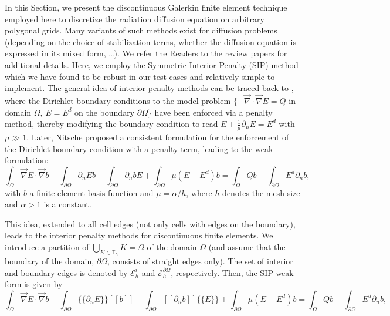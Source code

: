 \documentclass[preprint,10pt]{elsarticle}
\renewcommand{\div}{\vec{\nabla}\! \cdot \!}
\newcommand{\grad}{\vec{\nabla}}
\newcommand{\jmp}[1]{[\![#1]\!]}                     %
\newcommand{\mvl}[1]{\{\!\!\{#1\}\!\!\}}             %
\newcommand{\tf}{b}
\renewcommand{\(}{\left(}
\renewcommand{\)}{\right)}
\renewcommand{\[}{\left[}
\renewcommand{\]}{\right]}
\begin{document}
In this Section, we present the discontinuous Galerkin finite element technique employed here to
discretize the radiation diffusion equation on arbitrary polygonal grids. Many variants of such
methods exist for diffusion problems (depending on the choice of stabilization terms, whether 
the diffusion equation is expressed in its mixed form, \ldots). We refer the Readers to the review
papers \cite{unification,brezzi} for additional details. Here, we employ the Symmetric
Interior Penalty (SIP) method which we have found to be robust in our test cases and relatively simple 
to implement.
The general idea of interior penalty methods can be traced back to \cite{lions1968}, where the Dirichlet
boundary conditions to the model problem $\{-\div \grad E = Q$ in domain $\Omega$, $E=E^d$ on 
the boundary $\partial \Omega\}$ have been enforced via a penalty method, thereby modifying the 
boundary condition to read $E+\frac{1}{\mu}\partial_n E = E^d$ with $\mu\gg 1$. Later, 
Nitsche \cite{nitsche1971} proposed a consistent formulation for the enforcement of the 
Dirichlet boundary condition with a penalty term, leading to the weak formulation:
\begin{equation}
\label{eq:penalty_nitsche_1}
\int_{\Omega} \grad E \cdot \grad \tf
- \int_{\partial\Omega} \partial_n E \tf  
- \int_{\partial\Omega} \partial_n \tf E 
+ \int_{\partial\Omega} \mu(E-E^d) \tf 
=
\int_{\Omega} Q \tf 
- \int_{\partial\Omega} E^d \partial_n \tf ,
\end{equation}
with $\tf$ a finite element basis function and $\mu=\alpha/h$, where $h$ denotes 
the mesh size and $\alpha>1$ is a constant.

This idea, extended to all cell edges (not only cells with edges on the boundary), leads
to the interior penalty methods for discontinuous finite elements. We introduce a partition
of $\bigcup\nolimits_{K\in \mathbb{T}_{h}}K=\Omega$ of the domain $\Omega$ (and assume
that the boundary of the domain, $\partial \Omega$, consists of straight edges only). The 
set of interior and boundary edges is denoted by $\mathcal{E}_h^i$ and $\mathcal{E}_h^{\partial\Omega}$,
respectively.  Then, the SIP weak form is given by
\begin{equation}
\label{eq:penalty_nitsche_2}
\int_{\Omega} \grad E \cdot \grad \tf
- \int_{\partial\Omega} \mvl{\partial_n E} \jmp{\tf}  
- \int_{\partial\Omega} \jmp{\partial_n \tf} \mvl{E} 
+ \int_{\partial\Omega} \mu(E-E^d) \tf 
=
\int_{\Omega} Q \tf 
- \int_{\partial\Omega} E^d \partial_n \tf ,
\end{equation}
\end{document}
